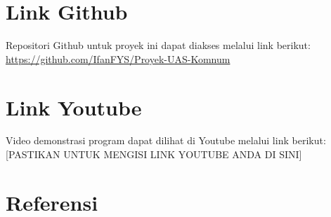 \documentclass[conference]{IEEEtran}
\begin{document}
\section*{Link Github}
Repositori Github untuk proyek ini dapat diakses melalui link berikut:
\url{https://github.com/IfanFYS/Proyek-UAS-Komnum}

\section*{Link Youtube}
Video demonstrasi program dapat dilihat di Youtube melalui link berikut:
[PASTIKAN UNTUK MENGISI LINK YOUTUBE ANDA DI SINI]

\section*{Referensi}



\end{document}
